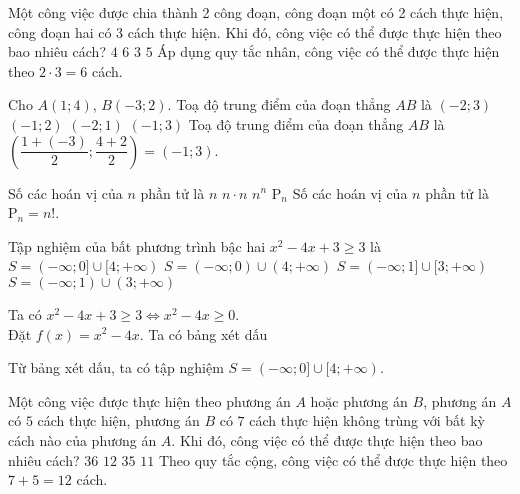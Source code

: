 \begin{ex}%
	Một công việc được chia thành 2 công đoạn, công đoạn một có 2 cách thực hiện, công đoạn hai có 3 cách thực hiện. Khi đó, công việc có thể được thực hiện theo bao nhiêu cách?
	\choice
	{$4$}
	{\True $6$}
	{$3$}
	{$5$}
	\loigiai
	{
	Áp dụng quy tắc nhân, công việc có thể được thực hiện theo $2 \cdot 3=6$ cách.
	}
\end{ex}
\begin{ex}%
	Cho $A(1;4)$, $B(-3; 2)$. Toạ độ trung điểm của đoạn thẳng $AB$ là
	\choice
	{$(-2 ; 3)$}
	{$(-1 ; 2)$}
	{$(-2 ; 1)$}
	{\True $(-1 ; 3)$}
	\loigiai
	{
 	Toạ độ trung điểm của đoạn thẳng $AB$ là $\left(\dfrac{1+(-3)}{2};\dfrac{4+2}{2}\right)=(-1;3)$.
	}
\end{ex}
\begin{ex}%
	Số các hoán vị của $n$ phần tử là
	\choice
	{$n$}
	{$n\cdot n$}
	{$n^n$}
	{\True $\mathrm{P}_n$}
	\loigiai
	{
		Số các hoán vị của $n$ phần tử là $\mathrm{P}_n=n!$.
	}
\end{ex}
\begin{ex}%
	Tập nghiệm của bất phương trình bậc hai $x^2-4x+3\ge 3$ là
	\choice
	{\True $S=(-\infty;0]\cup [4;+\infty)$}
	{$S=(-\infty;0)\cup (4;+\infty)$}
	{$S=(-\infty;1]\cup [3;+\infty)$}
	{$S=(-\infty;1)\cup (3;+\infty)$}
	\loigiai
	{
		Ta có $x^2-4x+3\ge 3\Leftrightarrow x^2-4x\ge 0$.\\
		Đặt $f(x)=x^2-4x$. Ta có bảng xét dấu
		\begin{center}
		\end{center}
		Từ bảng xét dấu, ta có tập nghiệm $S=(-\infty;0]\cup [4;+\infty)$.
	}
\end{ex}
\begin{ex}%
	Một công việc được thực hiện theo phương án $A$ hoặc phương án $B$, phương án $A$ có $5$ cách thực hiện, phương án $B$ có $7$ cách thực hiện không trùng với bất kỳ cách nào của phương án $A$. Khi đó, công việc có thể được thực hiện theo bao nhiêu cách?
	\choice
	{$36$}
	{\True $12$}
	{$35$}
	{$11$}
	\loigiai
	{
		Theo quy tắc cộng, công việc có thể được thực hiện theo $7+5=12$ cách.
	}
\end{ex}
